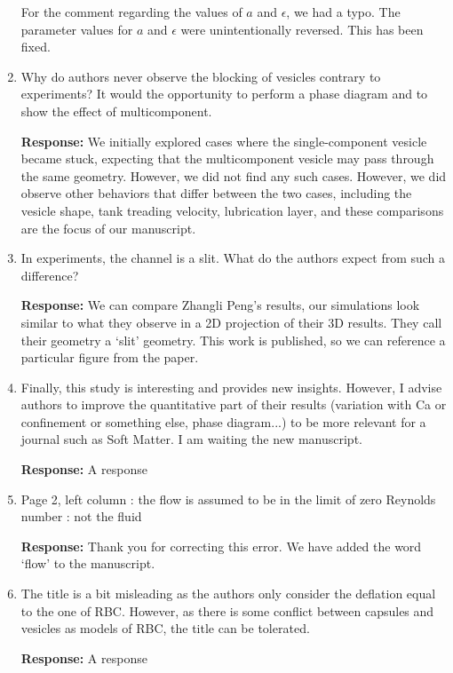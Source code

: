\documentclass[11pt]{article}
\begin{document}
\begin{enumerate}
For the comment regarding the values of $a$ and $\epsilon$, we had a
typo. The parameter values for $a$ and $\epsilon$ were unintentionally
reversed. This has been fixed.

\item Why do authors never observe the blocking of vesicles contrary to
  experiments? It would the opportunity to perform a phase diagram and
    to show the effect of multicomponent.

\noindent
{\bf Response:} We initially explored cases where the single-component
vesicle became stuck, expecting that the multicomponent vesicle may pass
through the same geometry.  However, we did not find any such cases.
However, we did observe other behaviors that differ between the two
cases, including the vesicle shape, tank treading velocity, lubrication
layer, and these comparisons are the focus of our manuscript.

%


\item In experiments, the channel is a slit. What do the authors expect
  from such a difference?

\noindent
{\bf Response:} We can compare Zhangli Peng's results, our simulations
look similar to what they observe in a 2D projection of their 3D
results. They call their geometry a `slit' geometry. This work is
published, so we can reference a particular figure from the paper.

\item Finally, this study is interesting and provides new insights.
  However, I advise authors to improve the quantitative part of their
  results (variation with Ca or confinement or something else, phase
  diagram...) to be more relevant for a journal such as Soft Matter. I
  am waiting the new manuscript.

\noindent
{\bf Response:} A response

\item Page 2, left column : the flow is assumed to be in the limit of
  zero Reynolds number : not the fluid

\noindent
{\bf Response:} Thank you for correcting this error. We have added the
word `flow' to the manuscript.

\item The title is a bit misleading as the authors only consider the
  deflation equal to the one of RBC. However, as there is some conflict
  between capsules and vesicles as models of RBC, the title can be
  tolerated.

\noindent
{\bf Response:} A response
\end{enumerate}
\end{document}
